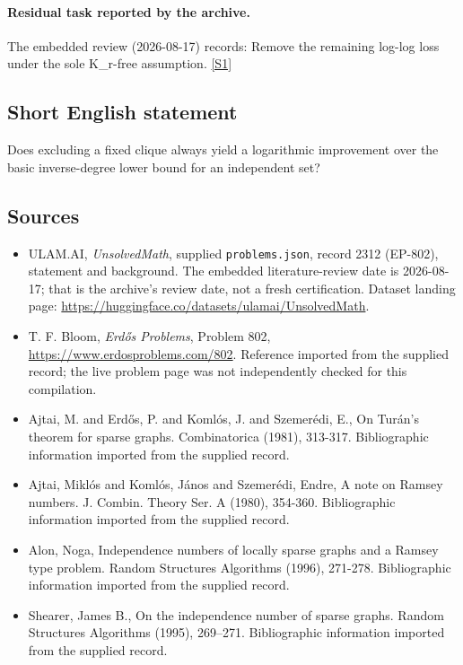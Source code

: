 \documentclass[11pt,a4paper]{article}
\newcommand{\sref}[2]{\hyperlink{source:#1:#2}{[S#2]}}
\begin{document}
\paragraph{Residual task reported by the archive.}

The embedded review (2026-08-17) records: Remove the remaining log-log loss under the sole K\_r-free assumption. \sref{2312}{1}

\subsection{Short English statement}

Does excluding a fixed clique always yield a logarithmic improvement over the basic inverse-degree lower bound for an independent set?

\subsection{Sources}

{\small

\begin{itemize}

\item[\hypertarget{source:2312:1}{S1}] ULAM.AI, \emph{UnsolvedMath}, supplied \texttt{problems.json}, record 2312 (EP-802), statement and background. The embedded literature-review date is 2026-08-17; that is the archive’s review date, not a fresh certification. Dataset landing page: \url{https://huggingface.co/datasets/ulamai/UnsolvedMath}.

\item[\hypertarget{source:2312:2}{S2}] T. F. Bloom, \emph{Erdős Problems}, Problem 802, \url{https://www.erdosproblems.com/802}. Reference imported from the supplied record; the live problem page was not independently checked for this compilation.

\item[\hypertarget{source:2312:3}{S3}] Ajtai, M. and Erd\H{o}s, P. and Koml\'{o}s, J. and Szemer\'{e}di, E., On Tur\'{a}n's theorem for sparse graphs. Combinatorica (1981), 313-317. Bibliographic information imported from the supplied record.

\item[\hypertarget{source:2312:4}{S4}] Ajtai, Mikl\'{o}s and Koml\'{o}s, J\'{a}nos and Szemer\'{e}di, Endre, A note on Ramsey numbers. J. Combin. Theory Ser. A (1980), 354-360. Bibliographic information imported from the supplied record.

\item[\hypertarget{source:2312:5}{S5}] Alon, Noga, Independence numbers of locally sparse graphs and a Ramsey type problem. Random Structures Algorithms (1996), 271-278. Bibliographic information imported from the supplied record.

\item[\hypertarget{source:2312:6}{S6}] Shearer, James B., On the independence number of sparse graphs. Random Structures Algorithms (1995), 269--271. Bibliographic information imported from the supplied record.

\end{itemize}

}

\label{end:2312}
\end{document}

